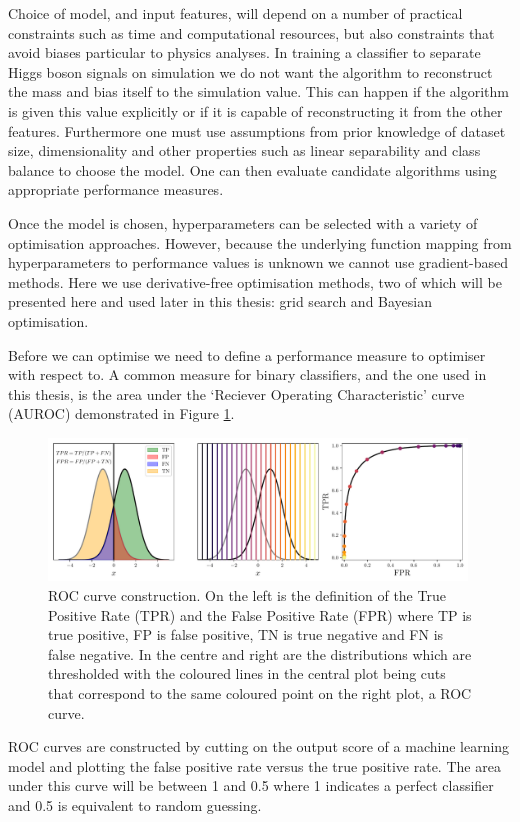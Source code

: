 Choice of model, and input features, will depend on a number of practical constraints such as time and computational resources, but also constraints that avoid biases particular to physics analyses. 
In training a classifier to separate Higgs boson signals on simulation we do not want the algorithm to reconstruct the mass and bias itself to the simulation value. This can happen if the algorithm is given this value explicitly or if it is capable of reconstructing it from the other features.  
Furthermore one must use assumptions from prior knowledge of dataset size, dimensionality and other properties such as linear separability and class balance to choose the model. One can then evaluate candidate algorithms using appropriate performance measures. 


Once the model is chosen, hyperparameters can be selected with a variety of optimisation approaches. However, because the underlying function mapping from hyperparameters to performance values is unknown we cannot use gradient-based methods. Here we use derivative-free optimisation methods, two of which will be presented here and used later in this thesis: grid search and Bayesian optimisation. 

Before we can optimise we need to define a performance measure to optimiser with respect to. A common measure for binary classifiers, and the one used in this thesis, is the area under the `Reciever Operating Characteristic' curve (AUROC) demonstrated in Figure \ref{fig:machine_learning:ROC_curve}. 
\begin{figure}[h!]
    \begin{center}
        \includegraphics[width=0.99\textwidth]{figures/machine_learning/ROC_figure.pdf}
    \end{center}
    \caption{ROC curve construction. On the left is the definition of the True Positive Rate (TPR) and the False Positive Rate (FPR) where TP is true positive, FP is false positive, TN is true negative and FN is false negative. In the centre and right are the distributions which are thresholded with the coloured lines in the central plot being cuts that correspond to the same coloured point on the right plot, a ROC curve. }
        \label{fig:machine_learning:ROC_curve}
\end{figure}
ROC curves are constructed by cutting on the output score of a machine learning model and plotting the false positive rate versus the true positive rate. The area under this curve will be between 1 and 0.5 where 1 indicates a perfect classifier and 0.5 is equivalent to random guessing. 


